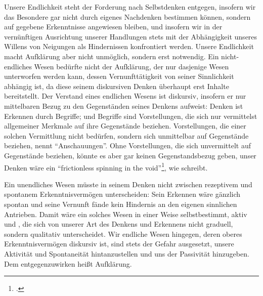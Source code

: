 

Unsere Endlichkeit steht der Forderung nach Selbstdenken entgegen,
insofern wir das Besondere gar nicht durch eigenes Nachdenken bestimmen können, sondern auf gegebene
Erkenntnisse angewiesen bleiben, und insofern wir in der vernünftigen
Ausrichtung unserer Handlungen stets mit der Abhängigkeit unseres Willens von
Neigungen als Hindernissen konfrontiert werden. Unsere Endlichkeit macht
Aufklärung aber nicht unmöglich, sondern erst notwendig. Ein nicht-endliches Wesen bedürfte nicht der Aufklärung, der nur
dasjenige Wesen unterworfen werden kann, dessen Vernunfttätigkeit von seiner
Sinnlichkeit abhängig ist, da diese seinem diskursiven Denken überhaupt erst
Inhalte bereitstellt. Der Verstand eines endlichen Wesens ist diskursiv,
insofern er nur mittelbaren Bezug zu den Gegenständen seines Denkens aufweist:
Denken ist Erkennen durch Begriffe; und Begriffe sind Vorstellungen, die sich
nur vermittelst allgemeiner Merkmale auf ihre Gegenstände beziehen.
Vorstellungen, die einer solchen Vermittlung nicht bedürfen, sondern sich
unmittelbar auf Gegenstände beziehen, nennt 
\enquote{Anschauungen}. Ohne Vorstellungen, die sich unvermittelt auf
Gegenstände beziehen, könnte es aber gar keinen Gegenstandsbezug geben, unser
Denken wäre ein \enquote{frictionless spinning in the
void}\footnote{\cite[][11]{McDowell:MindandWorld1994}.}, wie
 schreibt.


Ein unendliches Wesen müsste in seinem Denken nicht zwischen
rezeptivem und spontanem Erkenntnisvermögen unterscheiden: Sein Erkennen wäre
gänzlich spontan und seine Vernunft fände kein Hindernis an den eigenen
sinnlichen Antrieben. Damit wäre ein solches Wesen in einer Weise
selbstbestimmt, aktiv und , die sich von unserer Art des
Denkens und Erkennens nicht graduell, sondern qualitativ unterscheidet. Wir
endliche Wesen hingegen, deren oberes Erkenntnisvermögen diskursiv ist, sind stets der Gefahr ausgesetzt,
unsere Aktivität und Spontaneität hintanzustellen und uns der Passivität
hinzugeben. Dem entgegenzuwirken heißt Aufklärung.


